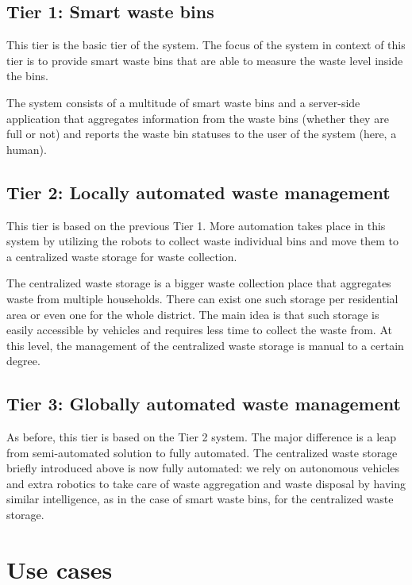 \documentclass{article}
\begin{document}
\subsection{Tier 1: Smart waste bins}

This tier is the basic tier of the system. The focus of the system in context of this tier is to
provide smart waste bins that are able to measure the waste level inside the bins.

The system consists of a multitude of smart waste bins and a server-side application that aggregates
information from the waste bins (whether they are full or not) and reports the waste bin statuses to
the user of the system (here, a human).

\subsection{Tier 2: Locally automated waste management}

This tier is based on the previous Tier 1. More automation takes place in this system by utilizing
the robots to collect waste individual bins and move them to a centralized waste storage for waste
collection.

The centralized waste storage is a bigger waste collection place that aggregates waste from multiple
households. There can exist one such storage per residential area or even one for the whole
district. The main idea is that such storage is easily accessible by vehicles and requires less time
to collect the waste from. At this level, the management of the centralized waste storage is manual
to a certain degree.

\subsection{Tier 3: Globally automated waste management}

As before, this tier is based on the Tier 2 system. The major difference is a leap from
semi-automated solution to fully automated. The centralized waste storage briefly introduced above
is now fully automated: we rely on autonomous vehicles and extra robotics to take care of waste
aggregation and waste disposal by having similar intelligence, as in the case of smart waste bins,
for the centralized waste storage.

\section{Use cases}
\end{document}
